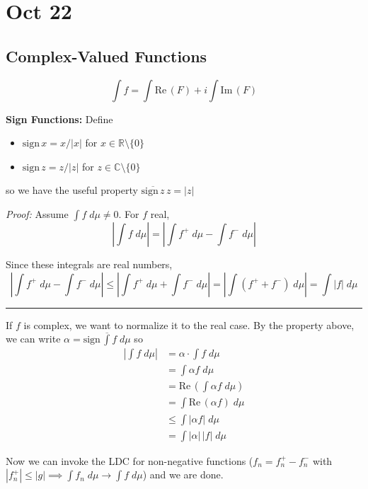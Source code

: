 \documentclass[12pt]{report}
\newcommand{\R}{\mathbb{R}}
\newcommand{\C}{\mathbb{C}}
\newcommand{\abs}[1]{\left\vert #1 \right\vert}
\renewcommand{\L}{\mathcal{L}}
\renewcommand{\div}{\vspace*{10pt}\hrule\vspace*{10pt}}
\renewcommand{\bar}[1]{\overline{#1}}
\renewcommand{\Re}{\text{Re}\,}
\renewcommand{\Im}{\text{Im}\,}
\newcommand{\sign}{\text{sign}\,}
\newcommand*{\tbf}[1]{\ifmmode\mathbf{#1}\else\textbf{#1}\fi}
\newenvironment*{tbox}[2][gray]{
    \begin{tcolorbox}[
        parbox=false,
        colback=#1!5!white,
        colframe=#1!75!black,
        breakable,
        title={#2}
    ]}
    {\end{tcolorbox}}
\begin{document}
\section{Oct 22}
    \subsection*{Complex-Valued Functions}
        \[\int f = \int \Re(F) + i \int \Im(F)\]

        \tbf{Sign Functions:} Define
        \begin{itemize}
            \item $\sign x = x/\abs{x}$ for $x \in \R\setminus \{0\}$ 
            \item $\sign z = z/\abs{z}$ for $z \in \C\setminus \{0\}$
        \end{itemize}
        so we have the useful property $\bar{\sign z} \, z = \abs{z}$

        \begin{tbox}{\textbf{Lemma:} If $f \in \L^1$, then $\abs{\int f \; d\mu} \leq \int \abs{f} \; d\mu$}
            \emph{Proof:} Assume $\int f \; d\mu \neq 0$. For $f$ real, 
            \[\abs{\int f \; d\mu} = \abs{\int f^+ \; d\mu - \int f^- \; d\mu} \] 

            Since these integrals are real numbers, 
            \[\abs{\int f^+ \; d\mu - \int f^- \; d\mu} \leq \abs{\int f^+ \; d\mu + \int f^- \; d\mu} = \abs{\int (f^+ + f^-) \; d\mu} = \int \abs{f} \; d\mu\]

            \div 

            If $f$ is complex, we want to normalize it to the real case. By the property above, we can write $\alpha = \bar{\sign \int f \; d\mu}$ so
            \begin{align*}
                \abs{\int f \; d\mu} &= \alpha \cdot \int f \; d\mu\\ 
                    &= \int \alpha f \; d\mu\\ 
                    &= \Re\left(\int \alpha f \; d\mu\right)\\ 
                    &= \int \Re(\alpha f) \; d\mu\\ 
                    &\leq \int \abs{\alpha f} \; d\mu\\
                    &= \int \abs{\alpha}\, \abs{f}\; d\mu
            \end{align*}

            Now we can invoke the LDC for non-negative functions ($f_n = f^+_n - f^-_n$ with $\abs{f_n^+} \leq \abs{g} \implies \int f_n \; d\mu \to \int f \; d\mu$) and we are done.
        \end{tbox}
\end{document}
